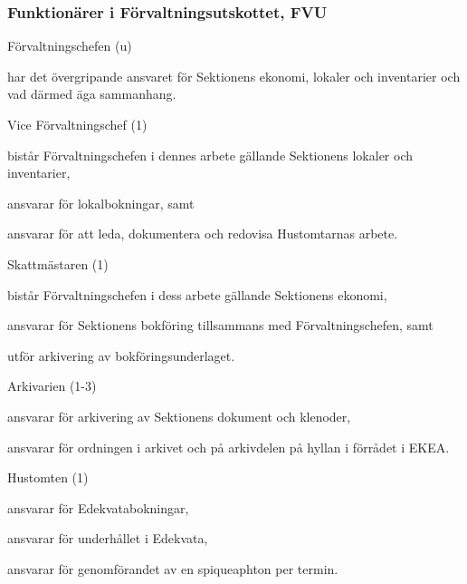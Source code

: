 \documentclass[10pt]{article}
\begin{document}
\subsubsection{Funktionärer i Förvaltningsutskottet, FVU}
\begin{emptylist}
    \item Förvaltningschefen (u)
        \begin{dashlist}
            \item har det övergripande ansvaret för Sektionens ekonomi,
                lokaler och inventarier och vad därmed äga sammanhang.
        \end{dashlist}
    \item Vice Förvaltningschef (1)
        \begin{dashlist}
            \item bistår Förvaltningschefen i dennes arbete gällande Sektionens lokaler och inventarier,
            \item ansvarar för lokalbokningar, samt
            \item ansvarar för att leda, dokumentera och redovisa Hustomtarnas arbete.
        \end{dashlist}
    \item Skattmästaren (1)
        \begin{dashlist}
            \item bistår Förvaltningschefen i dess arbete gällande Sektionens ekonomi,
            \item ansvarar för Sektionens bokföring tillsammans med Förvaltningschefen, samt
            \item utför arkivering av bokföringsunderlaget.
        \end{dashlist}
    \item Arkivarien (1-3)
        \begin{dashlist}
            \item ansvarar för arkivering av Sektionens dokument och
                klenoder,
            \item ansvarar för ordningen i arkivet och på arkivdelen
                på hyllan i förrådet i EKEA.
        \end{dashlist}
    \item Hustomten (1)
        \begin{dashlist}
            \item ansvarar för Edekvatabokningar,
            \item ansvarar för underhållet i Edekvata,
            \item ansvarar för genomförandet av en spiqueaphton per termin.

\end{dashlist}
\end{emptylist}
\end{document}

